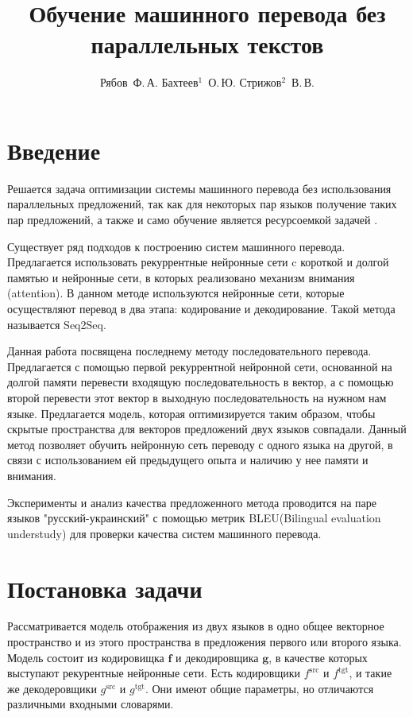 \documentclass[12pt,twoside]{article}
\title
    [Обучение машинного перевода без параллельных текстов] %
    {Обучение машинного перевода без параллельных текстов}
\author
    [Рябов~Ф.\,А. Бахтеев$^1$~О.\,Ю.  Стрижов$^2$~В.\,В.] %
    {Рябов~Ф.\,А. Бахтеев$^1$~О.\,Ю.  Стрижов$^2$~В.\,В.} %
    [Рябов~Ф.\,А. Бахтеев$^1$~О.\,Ю.  Стрижов$^2$~В.\,В.] %
\begin{document}
\maketitle

\section{Введение}
{Решается задача оптимизации системы машинного перевода без использования параллельных предложений, так как для некоторых пар языков получение таких пар предложений, а также и само обучение является ресурсоемкой задачей \cite{conneau2017word}. 

Существует ряд подходов к построению систем машинного перевода\cite{koehn2007moses,koehn2009statistical,wu2016google}. Предлагается использовать рекуррентные нейронные сети c короткой и долгой памятью и нейронные сети, в которых реализовано механизм внимания (attention). В данном методе используются нейронные сети, которые осуществляют перевод в два этапа: кодирование и декодирование. Такой метода называется Seq2Seq\cite{weiss2017sequence, sutskever2014sequence}.

Данная работа посвящена последнему методу последовательного перевода. Предлагается с помощью первой рекуррентной нейронной сети, основанной на долгой памяти перевести входящую последовательность в вектор, а с помощью второй перевести этот вектор в выходную последовательность на нужном нам языке\cite{cho2014properties}. Предлагается модель, которая оптимизируется таким образом, чтобы скрытые пространства для векторов предложений двух языков совпадали.
 Данный метод позволяет обучить нейронную сеть переводу с одного языка на другой, в связи с использованием ей предыдущего опыта и наличию у нее памяти и внимания.

Эксперименты и анализ качества предложенного метода проводится на паре языков "русский-украинский" с помощью метрик BLEU(Bilingual evaluation understudy) для проверки качества систем машинного перевода\cite{papineni2002bleu}.}


\section{Постановка задачи}

Рассматривается модель отображения из двух языков в одно общее векторное пространство и из этого пространства в предложения первого или второго языка. Модель состоит из кодировищка $\mathbf{f}$ и декодировщика $\mathbf{g}$, в качестве которых выступают рекурентные нейронные сети. Есть кодировщики  $f^{\text{src}}$  и $f^{\text{tgt}}$,
и такие же декодеровщики $g^{\text{src}}$ и $g^{\text{tgt}}$. Они имеют общие параметры, но отличаются различными входными словарями.
\vspace{\baselineskip}
\end{document}
